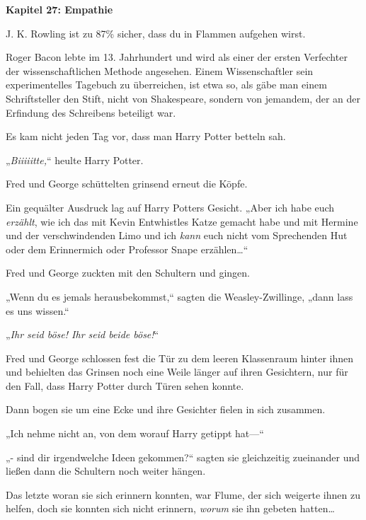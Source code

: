 

\hypertarget{empathie}{%

\textbf{Kapitel 27: Empathie}

J. K. Rowling ist zu 87\% sicher, dass du in Flammen aufgehen wirst.

Roger Bacon lebte im 13. Jahrhundert und wird als einer der ersten Verfechter der wissenschaftlichen Methode angesehen. Einem Wissenschaftler sein experimentelles Tagebuch zu überreichen, ist etwa so, als gäbe man einem Schriftsteller den Stift, nicht von Shakespeare, sondern von jemandem, der an der Erfindung des Schreibens beteiligt war.

\later

Es kam nicht jeden Tag vor, dass man Harry Potter betteln sah.

„\emph{Biiiiitte,}“ heulte Harry Potter.

Fred und George schüttelten grinsend erneut die Köpfe.

Ein gequälter Ausdruck lag auf Harry Potters Gesicht. „Aber ich habe euch \emph{erzählt}, wie ich das mit Kevin Entwhistles Katze gemacht habe und mit Hermine und der verschwindenden Limo und ich \emph{kann} euch nicht vom Sprechenden Hut oder dem Erinnermich oder Professor Snape erzählen…“

Fred und George zuckten mit den Schultern und gingen.

„Wenn du es jemals herausbekommst,“ sagten die Weasley-Zwillinge, „dann lass es uns wissen.“

„\emph{Ihr seid böse! Ihr seid beide böse!}“

Fred und George schlossen fest die Tür zu dem leeren Klassenraum hinter ihnen und behielten das Grinsen noch eine Weile länger auf ihren Gesichtern, nur für den Fall, dass Harry Potter durch Türen sehen konnte.

Dann bogen sie um eine Ecke und ihre Gesichter fielen in sich zusammen.

„Ich nehme nicht an, von dem worauf Harry getippt hat—“

„- sind dir irgendwelche Ideen gekommen?“ sagten sie gleichzeitig zueinander und ließen dann die Schultern noch weiter hängen.

Das letzte woran sie sich erinnern konnten, war Flume, der sich weigerte ihnen zu helfen, doch sie konnten sich nicht erinnern, \emph{worum} sie ihn gebeten hatten…

}
